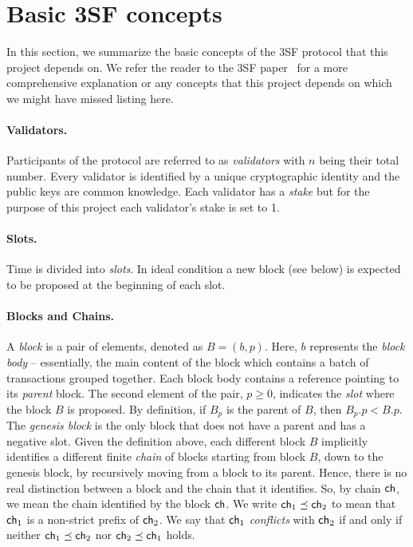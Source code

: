 
\section{Basic 3SF concepts}\label{sec:3sf}

In this section, we summarize the basic concepts of the 3SF protocol that this project depends on.
We refer the reader to the 3SF paper~\cite{d20243} for a more comprehensive explanation or any concepts that this project depends on which we might have missed listing here.

\paragraph*{Validators.} Participants of the protocol are referred to as \emph{validators} with $n$ being their total number.
Every validator is identified by a unique cryptographic identity and the public keys are common knowledge. 
Each validator has a \emph{stake} but for the purpose of this project each validator's stake is set to 1.

\paragraph*{Slots.} Time is divided into \emph{slots}. 
In ideal condition a new block (see below) is expected to be proposed at the beginning of each slot.

\paragraph{Blocks and Chains.} 
A \emph{block} is a pair of elements, denoted as \( B = (b,p) \). Here, \( b \) represents the \emph{block body} -- essentially, the main content of the block which contains a batch of transactions grouped together.
Each block body contains a reference pointing to its \emph{parent} block. 
The second element of the pair, \( p \geq 0 \), indicates the \emph{slot} where the block \( B \) is proposed.
By definition, if $B_p$ is the parent of $B$, then $B_p.p < B.p$.
The \emph{genesis block} is the only block that does not have a parent {and has a negative slot}.
Given the definition above, each different block $B$ implicitly identifies a different finite \emph{chain} of blocks starting from block $B$, down to the genesis block, by recursively moving from a block to its parent.
Hence, there is no real distinction between a block and the chain that it identifies.
So, by chain $\mathsf{ch}$, we mean the chain identified by the block $\mathsf{ch}$.
We write $\mathsf{ch}_1 \preceq \mathsf{ch}_2$ to mean that $\mathsf{ch}_1$ is a non-strict prefix of $\mathsf{ch}_2$.
We say that $\mathsf{ch}_1$ \emph{conflicts} with $\mathsf{ch}_2$ if and only if neither $\mathsf{ch}_1 \preceq \mathsf{ch}_2$ nor $\mathsf{ch}_2 \preceq \mathsf{ch}_1$ holds. 

